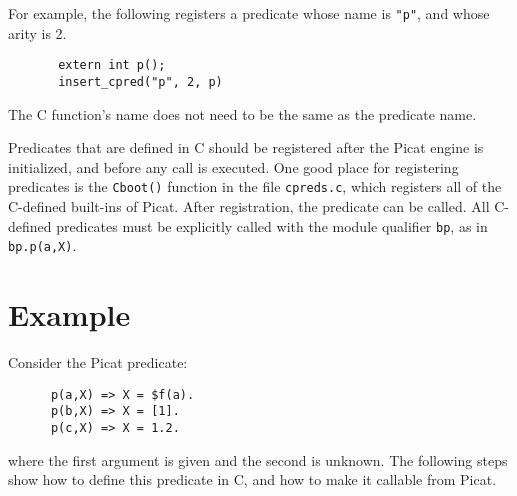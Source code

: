 For example, the following registers a predicate whose name is \texttt{"p"}, and whose arity is 2.
\begin{verbatim}
       extern int p();	
       insert_cpred("p", 2, p)
\end{verbatim}
The C function's name does not need to be the same as the predicate name.

Predicates that are defined in C should be registered after the Picat engine is initialized, and before any call is executed. One good place for registering predicates is the \texttt{Cboot()} function in the file \texttt{cpreds.c}, which registers all of the C-defined built-ins of Picat. After registration, the predicate can be called. All C-defined predicates must be explicitly called with the module qualifier \texttt{bp}, as in \texttt{bp.p(a,X)}.

\section*{Example}
Consider the Picat predicate:
\begin{verbatim}
      p(a,X) => X = $f(a).
      p(b,X) => X = [1].
      p(c,X) => X = 1.2.
\end{verbatim}
where the first argument is given and the second is unknown. The following steps show how to define this predicate in C, and how to make it callable from Picat.

